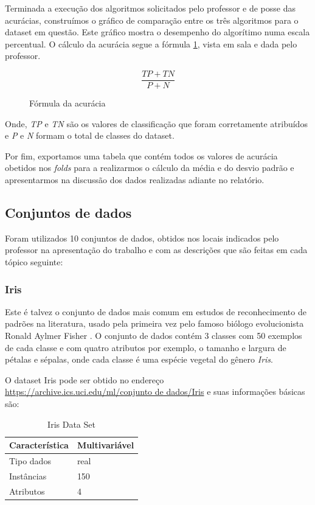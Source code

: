 \documentclass[12pt, a4paper]{article}
\begin{document}
Terminada a execução dos algoritmos solicitados pelo professor e de posse das acurácias, construímos o gráfico de comparação entre os três algoritmos para o dataset em questão. Este gráfico mostra o desempenho do algorítimo numa escala percentual. O cálculo da acurácia segue a fórmula \ref{foracur}, vista em sala e dada pelo professor.

\begin{figure}[!ht]
\centering
	\label{foracur}
	\[\frac{TP+TN}{P+N}\]
    \caption{Fórmula da acurácia}
\end{figure}

Onde, \textit{TP} e \textit{TN} são os valores de classificação que foram corretamente atribuídos e \textit{P} e \textit{N} formam o total de classes do dataset.

Por fim, exportamos uma tabela que contém todos os valores de acurácia obetidos nos \textit{folds} para a realizarmos o cálculo da média e do desvio padrão e apresentarmos na discussão dos dados realizadas adiante no relatório.

\subsection{Conjuntos de dados}

Foram utilizados 10 conjuntos de dados, obtidos nos locais indicados pelo professor na apresentação do trabalho e com as descrições que são feitas em cada tópico seguinte:

\subsubsection{Iris}
Este é talvez o conjunto de dados mais comum em estudos de reconhecimento de padrões na literatura, usado pela primeira vez pelo famoso biólogo evolucionista Ronald Aylmer Fisher \citep{Fisher1936}. O conjunto de dados contém 3 classes com 50 exemplos de cada classe e com quatro atributos por exemplo, o tamanho e largura de pétalas e sépalas, onde cada classe é uma espécie vegetal do gênero \emph{Iris}.

O dataset Iris pode ser obtido no endereço \url{https://archive.ics.uci.edu/ml/conjunto de dados/Iris} e suas informações básicas são:
\begin{table}[!ht]
\centering
\caption{Iris Data Set}
\label{iristable}
\begin{tabular}{|l|l|}
\hline
Característica & Multivariável\\
\hline
Tipo dados & real\\
\hline
Instâncias & 150\\
\hline
Atributos & 4 \\
\hline
\end{tabular}
\end{table}
\end{document}

